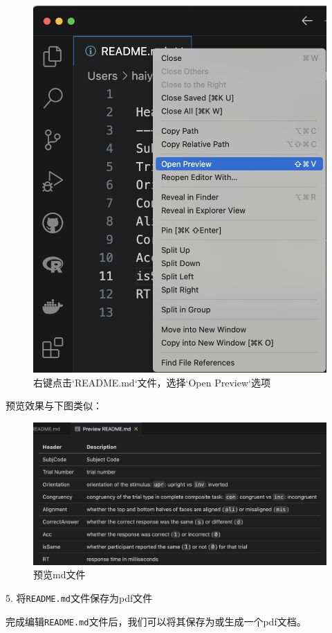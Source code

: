\documentclass[]{ctexbook}
\theoremstyle{definition}
\theoremstyle{definition}
\theoremstyle{definition}
\theoremstyle{definition}
\theoremstyle{remark}
\begin{document}
\begin{figure}

{\centering \includegraphics[width=0.6\linewidth]{img/vscode/mkreadme_openpreview} 

}

\caption{右键点击`README.md`文件，选择`Open Preview`选项}\label{fig:mkreadme-openpreview}
\end{figure}

预览效果与下图类似：

\begin{figure}

{\centering \includegraphics[width=1\linewidth]{img/vscode/mkreadme_preview} 

}

\caption{预览md文件}\label{fig:mkreadme-preview}
\end{figure}

5. 将\texttt{README.md}文件保存为pdf文件

完成编辑\texttt{README.md}文件后，我们可以将其保存为或生成一个pdf文档。
\end{document}
